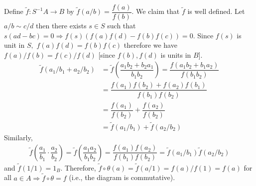 \documentclass[11pt]{amsart}
\begin{document}
\proof Define $\tilde{f}:S^{-1}A\to B$ by $\tilde{f}(a/b)=\dfrac{f(a)}{f(b)}.$ We claim that $\tilde{f}$ is well defined. Let $a/b \sim c/d$ then there exists $s\in S$ such that $s(ad-bc)=0\Rightarrow f(s)(f(a)f(d)-f(b)f(c))=0.$ Since $f(s)$ is unit in $S,$ $f(a)f(d)=f(b)f(c)$ therefore we have $f(a)/f(b)=f(c)/f(d)$ [since $f(b),f(d)$ is units in $B$]. 
\begin{align*}
\tilde{f}(a_1/b_1+a_2/b_2)&=\tilde{f}\left(\dfrac{a_1b_2+b_2a_1}{b_1b_2}\right)=\dfrac{f(a_1b_2+b_1a_2)}{f(b_1b_2)}\\
&=\dfrac{f(a_1)f(b_2)+f(a_2)f(b_1)}{f(b_1)f(b_2)}\\
&=\dfrac{f(a_1)}{f(b_2)}+\dfrac{f(a_2)}{f(b_2)}\\
&=\tilde{f}(a_1/b_1)+\tilde{f}(a_2/b_2)
\end{align*}
Similarly, \begin{align*}
\tilde{f}\left(\dfrac{a_1}{b_1}\cdot \dfrac{a_2}{b_2}\right)=\tilde{f}\left(\dfrac{a_1a_2}{b_1b_2}\right)=\dfrac{f(a_1)f(a_2)}{f(b_1)f(b_2)}=\tilde{f}(a_1/b_1)\tilde{f}(a_2/b_2)
\end{align*}
and $\tilde{f}(1/1)=1_B.$ Therefore, $\tilde{f}\circ \theta(a)=\tilde{f}(a/1)=f(a)/f(1)=f(a)$ for all $a\in A \Rightarrow \tilde{f}\circ \theta=f$ (i.e., the diagram is commutative).
\end{document}
